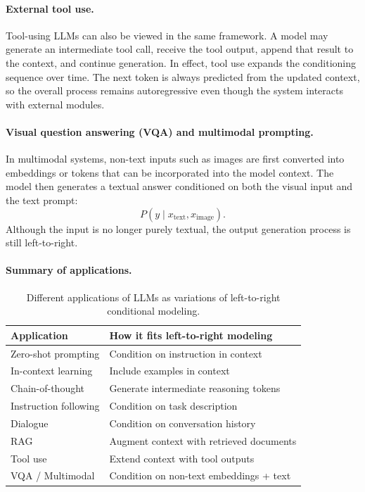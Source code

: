 \documentclass{article}
\begin{document}
\paragraph{External tool use.}
Tool-using LLMs can also be viewed in the same framework. A model may generate an intermediate tool call, receive the tool output, append that result to the context, and continue generation. In effect, tool use expands the conditioning sequence over time. The next token is always predicted from the updated context, so the overall process remains autoregressive even though the system interacts with external modules.

\paragraph{Visual question answering (VQA) and multimodal prompting.}
In multimodal systems, non-text inputs such as images are first converted into embeddings or tokens that can be incorporated into the model context. The model then generates a textual answer conditioned on both the visual input and the text prompt:
\[
P(y \mid x_{\text{text}}, x_{\text{image}}).
\]
Although the input is no longer purely textual, the output generation process is still left-to-right.

\paragraph{Summary of applications.}

\begin{table}[H]
\centering
\begin{tabular}{|p{4cm}|p{6cm}|}
\hline
\textbf{Application} & \textbf{How it fits left-to-right modeling} \\
\hline
Zero-shot prompting & Condition on instruction in context \\
\hline
In-context learning & Include examples in context \\
\hline
Chain-of-thought & Generate intermediate reasoning tokens \\
\hline
Instruction following & Condition on task description \\
\hline
Dialogue & Condition on conversation history \\
\hline
RAG & Augment context with retrieved documents \\
\hline
Tool use & Extend context with tool outputs \\
\hline
VQA / Multimodal & Condition on non-text embeddings + text \\
\hline
\end{tabular}
\caption{Different applications of LLMs as variations of left-to-right conditional modeling.}
\end{table}
\end{document}
